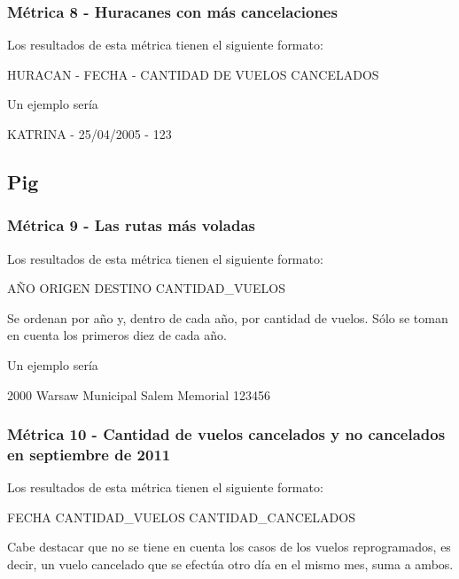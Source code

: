 \documentclass[a4paper,10pt]{article}
\begin{document}
        \subsubsection{Métrica 8 - Huracanes con más cancelaciones}
        Los resultados de esta métrica tienen el siguiente formato:\\
            \begin{center}
                HURACAN - FECHA - CANTIDAD DE VUELOS CANCELADOS
            \end{center}

            Un ejemplo sería\\
            \begin{center}
            KATRINA - 25/04/2005 - 123\\
            \end{center}


    \subsection{Pig}
       \subsubsection{Métrica 9 - Las rutas más voladas}
            Los resultados de esta métrica tienen el siguiente formato:\\
            \begin{center}
                AÑO ORIGEN DESTINO CANTIDAD\_VUELOS
            \end{center}
            Se ordenan por año y, dentro de cada año, por cantidad de vuelos. Sólo se toman en cuenta los primeros diez de cada año.

            Un ejemplo sería\\
            \begin{center}
                2000  Warsaw Municipal  Salem Memorial  123456\\
            \end{center}

       \subsubsection{Métrica 10 - Cantidad de vuelos cancelados y no cancelados en septiembre de 2011}
            Los resultados de esta métrica tienen el siguiente formato:\\
            \begin{center}
                FECHA CANTIDAD\_VUELOS  CANTIDAD\_CANCELADOS
            \end{center}
            Cabe destacar que no se tiene en cuenta los casos de los vuelos reprogramados, es decir, un vuelo cancelado que se efectúa otro día en el mismo mes, suma a ambos.
\end{document}
